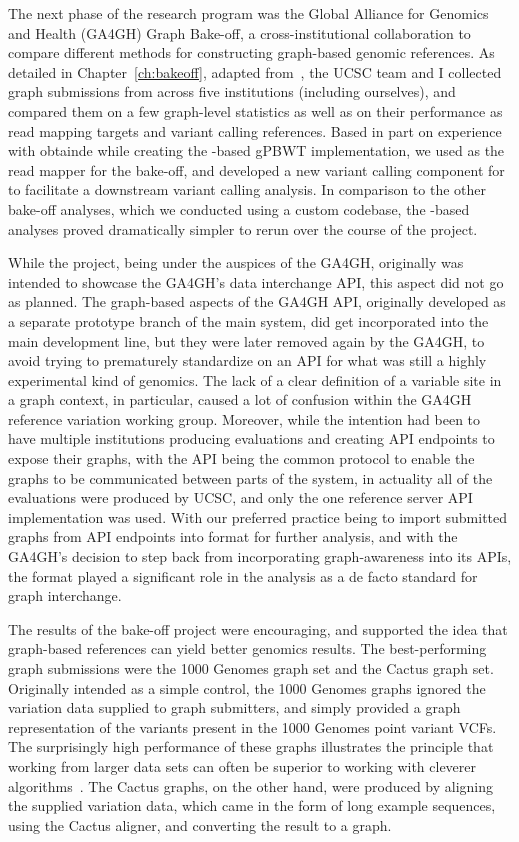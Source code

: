The next phase of the research program was the Global Alliance for Genomics and Health (GA4GH) Graph Bake-off, a cross-institutional collaboration to compare different methods for constructing graph-based genomic references. As detailed in Chapter~\ref{ch:bakeoff}, adapted from~\citet{novak2017genome}, the UCSC team and I collected graph submissions from across five institutions (including ourselves), and compared them on a few graph-level statistics as well as on their performance as read mapping targets and variant calling references. Based in part on experience with \vg obtainde while creating the \vg-based gPBWT implementation, we used \vg as the read mapper for the bake-off, and developed a new variant calling component for \vg to facilitate a downstream variant calling analysis. In comparison to the other bake-off analyses, which we conducted using a custom codebase, the \vg-based analyses proved dramatically simpler to rerun over the course of the project.

While the project, being under the auspices of the GA4GH, originally was intended to showcase the GA4GH's data interchange API, this aspect did not go as planned. The graph-based aspects of the GA4GH API, originally developed as a separate prototype branch of the main system, did get incorporated into the main development line, but they were later removed again by the GA4GH, to avoid trying to prematurely  standardize on an API for what was still a highly experimental kind of genomics. The lack of a clear definition of a variable site in a graph context, in particular, caused a lot of confusion within the GA4GH reference variation working group. Moreover, while the intention had been to have multiple institutions producing evaluations and creating API endpoints to expose their graphs, with the API being the common protocol to enable the graphs to be communicated between parts of the system, in actuality all of the evaluations were produced by UCSC, and only the one reference server API implementation was used. With our preferred practice being to import submitted graphs from API endpoints into \vg format for further analysis, and with the GA4GH's decision to step back from incorporating graph-awareness into its APIs, the \vg format played a significant role in the analysis as a de facto standard for graph interchange.

The results of the bake-off project were encouraging, and supported the idea that graph-based references can yield better genomics results. The best-performing graph submissions were the 1000 Genomes graph set and the Cactus graph set. Originally intended as a simple control, the 1000 Genomes graphs ignored the variation data supplied to graph submitters, and simply provided a graph representation of the variants present in the 1000 Genomes point variant VCFs. The surprisingly high performance of these graphs illustrates the principle that working from larger data sets can often be superior to working with cleverer algorithms~\cite{halevy2009unreasonable}. The Cactus graphs, on the other hand, were produced by aligning the supplied variation data, which came in the form of long example sequences, using the Cactus aligner, and converting the result to a graph.

